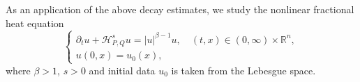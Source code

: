 \documentclass[12pt, reqno]{amsart}
\theoremstyle{definition}
\theoremstyle{remark}
\numberwithin{equation}{section}
\newcommand{\APQ}{\mathcal{H}_{P, Q}}
\begin{document}







As an application of the above decay estimates, we study the nonlinear fractional heat equation
\begin{equation}
\label{eq6.1inro}
\begin{cases}
\partial_t u+\APQ^s u=|u|^{\beta-1}u,
\quad (t,x)\in (0,\infty)\times\mathbb{R}^n,\\
u(0,x)=u_0(x),
\end{cases}
\end{equation}
where $\beta>1$, $s>0$ and initial data $u_0$ is taken from the Lebesgue space.
\end{document}
